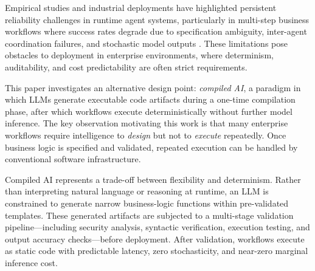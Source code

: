 \documentclass[11pt]{article}
\begin{document}
Empirical studies and industrial deployments have highlighted persistent reliability challenges in runtime agent systems, particularly in multi-step business workflows where success rates degrade due to specification ambiguity, inter-agent coordination failures, and stochastic model outputs \citep{cemri2025multiagent, atil2024nondeterminism}. These limitations pose obstacles to deployment in enterprise environments, where determinism, auditability, and cost predictability are often strict requirements.

This paper investigates an alternative design point: \emph{compiled AI}, a paradigm in which LLMs generate executable code artifacts during a one-time compilation phase, after which workflows execute deterministically without further model inference. The key observation motivating this work is that many enterprise workflows require intelligence to \emph{design} but not to \emph{execute} repeatedly. Once business logic is specified and validated, repeated execution can be handled by conventional software infrastructure.

Compiled AI represents a trade-off between flexibility and determinism. Rather than interpreting natural language or reasoning at runtime, an LLM is constrained to generate narrow business-logic functions within pre-validated templates. These generated artifacts are subjected to a multi-stage validation pipeline—including security analysis, syntactic verification, execution testing, and output accuracy checks—before deployment. After validation, workflows execute as static code with predictable latency, zero stochasticity, and near-zero marginal inference cost.
\end{document}
